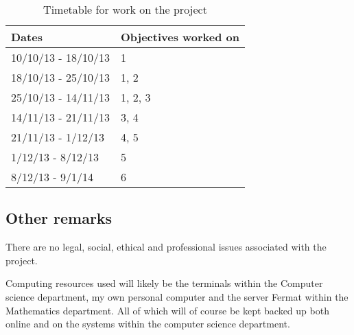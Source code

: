 \documentclass[11pt,a4paper]{article}
\begin{document}
\begin{table}[h]
\centering
\begin{tabular}{|l|l|}
\hline
Dates & Objectives worked on \\
\hline
10/10/13 - 18/10/13 & 1 \\
18/10/13 - 25/10/13 & 1, 2 \\
25/10/13 - 14/11/13 & 1, 2, 3 \\
14/11/13 - 21/11/13 & 3, 4 \\
21/11/13 - 1/12/13 & 4, 5 \\
1/12/13 - 8/12/13 & 5 \\
8/12/13 - 9/1/14 & 6 \\
\hline
\end{tabular}
\caption{\label{}Timetable for work on the project}
\end{table}

\subsection*{Other remarks}
There are no legal, social, ethical and professional issues associated with the
project.

Computing resources used will likely be the terminals within the 
Computer science department, my own personal computer and the server Fermat
within the Mathematics department.
All of which will of course be kept backed up both online and on the systems
within the computer science department.



\end{document}
